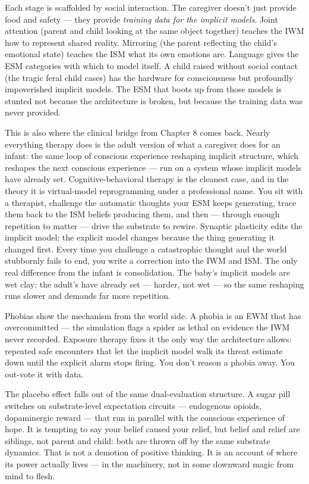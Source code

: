 \documentclass[11pt, twoside, openright]{book}
\begin{document}
Each stage is scaffolded by social interaction. The caregiver doesn't just provide food and safety --- they provide \textit{training data for the implicit models}. Joint attention (parent and child looking at the same object together) teaches the IWM how to represent shared reality. Mirroring (the parent reflecting the child's emotional state) teaches the ISM what its own emotions are. Language gives the ESM categories with which to model itself. A child raised without social contact (the tragic feral child cases) has the hardware for consciousness but profoundly impoverished implicit models. The ESM that boots up from those models is stunted not because the architecture is broken, but because the training data was never provided.

This is also where the clinical bridge from Chapter 8 comes back. Nearly everything therapy does is the adult version of what a caregiver does for an infant: the same loop of conscious experience reshaping implicit structure, which reshapes the next conscious experience --- run on a system whose implicit models have already set. Cognitive-behavioral therapy is the cleanest case, and in the theory it is virtual-model reprogramming under a professional name. You sit with a therapist, challenge the automatic thoughts your ESM keeps generating, trace them back to the ISM beliefs producing them, and then --- through enough repetition to matter --- drive the substrate to rewire. Synaptic plasticity edits the implicit model; the explicit model changes because the thing generating it changed first. Every time you challenge a catastrophic thought and the world stubbornly fails to end, you write a correction into the IWM and ISM. The only real difference from the infant is consolidation. The baby's implicit models are wet clay; the adult's have already set --- harder, not wet --- so the same reshaping runs slower and demands far more repetition.

Phobias show the mechanism from the world side. A phobia is an EWM that has overcommitted --- the simulation flags a spider as lethal on evidence the IWM never recorded. Exposure therapy fixes it the only way the architecture allows: repeated safe encounters that let the implicit model walk its threat estimate down until the explicit alarm stops firing. You don't reason a phobia away. You out-vote it with data.

The placebo effect falls out of the same dual-evaluation structure. A sugar pill switches on substrate-level expectation circuits --- endogenous opioids, dopaminergic reward --- that run in parallel with the conscious experience of hope. It is tempting to say your belief caused your relief, but belief and relief are siblings, not parent and child: both are thrown off by the same substrate dynamics. That is not a demotion of positive thinking. It is an account of where its power actually lives --- in the machinery, not in some downward magic from mind to flesh.
\end{document}
